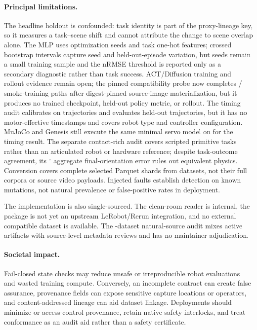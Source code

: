 \paragraph{Principal limitations.}
The headline holdout is confounded: task identity is part of the proxy-lineage key, so it measures a
task--scene shift and cannot attribute the change to scene overlap alone. The MLP uses
\ExpMlpSeedCount{} optimization seeds and task one-hot features; crossed bootstrap intervals capture
seed and held-out-episode variation, but \ExpMlpSeedCount{} seeds remain a small training sample and
the \ExpOfflineSuccessThreshold{} nRMSE threshold is reported only as a secondary diagnostic rather
than task success. ACT/Diffusion training and rollout evidence remain open; the pinned compatibility
probe now completes \ExpPolicyVisionTrainingStepCount{}/\ExpPolicyVisionProbeCount{}
smoke-training paths after digest-pinned source-image materialization, but it produces no trained
checkpoint, held-out policy metric, or rollout. The timing audit calibrates on
\ExpTimingCalibrationEpisodes{} trajectories and evaluates \ExpTimingHeldoutEpisodes{} held-out
trajectories, but it has no motor-effective timestamps and covers
\ExpTimingRobotTypeCount{} robot type and \ExpTimingControllerConfigurationCount{} controller
configuration. MuJoCo and Genesis still execute the same minimal servo model on
\ExpReplayTraceCount{} \ExpReplayTraceNoun{} for the timing result. The separate contact-rich audit
covers \ExpContactReplayTaskCount{} scripted primitive tasks rather than an articulated robot or
hardware reference; despite \ExpContactReplayOutcomeAgreement{} task-outcome agreement, its
\ExpContactReplayFinalOrientationDeg$^\circ$ aggregate final-orientation error rules out equivalent
physics. Conversion
covers complete selected Parquet shards from
\ExpConversionScaleDatasetCount{} datasets, not their full corpora or source video payloads. Injected faults establish
detection on known mutations, not natural prevalence or false-positive rates in deployment.

The implementation is also single-sourced. The clean-room reader is internal, the package is not
yet an upstream LeRobot/Rerun integration, and no external compatible dataset is available. The
\ExpNaturalDatasetCount-dataset natural-source audit mixes \ExpNaturalActiveDatasetCount{} active
artifacts with \ExpNaturalSourceLevelDatasetCount{} source-level metadata reviews and has no
maintainer adjudication.

\paragraph{Societal impact.}
Fail-closed state checks may reduce unsafe or irreproducible robot evaluations and wasted training
compute. Conversely, an incomplete contract can create false assurance, provenance fields can expose
sensitive capture locations or operators, and content-addressed lineage can aid dataset linkage.
Deployments should minimize or access-control provenance, retain native safety interlocks, and treat
conformance as an audit aid rather than a safety certificate.
